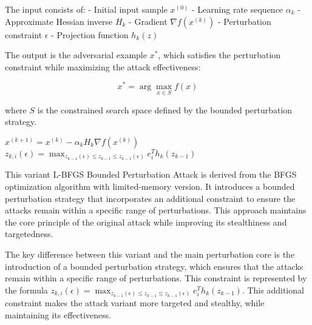 The input consists of:
- Initial input sample $x^{(0)}$
- Learning rate sequence $\alpha_k$
- Approximate Hessian inverse $H_k$
- Gradient $\nabla f(x^{(k)})$
- Perturbation constraint $\epsilon$
- Projection function $h_k(z)$

The output is the adversarial example $x^*$, which satisfies the perturbation constraint while maximizing the attack effectiveness:

\[
x^* = \arg\max_{x \in S} f(x)
\]

where $S$ is the constrained search space defined by the bounded perturbation strategy.

$x^{(k+1)} = x^{(k)} - \alpha_k H_k \nabla f(x^{(k)})$
$z_{k,i}(\epsilon) = \max_{z_{k-1}(\epsilon) \leq z_{k-1} \leq z_{k-1}(\epsilon)} e^T_i h_k(z_{k-1})$

This variant L-BFGS Bounded Perturbation Attack is derived from the BFGS optimization algorithm with limited-memory version. It introduces a bounded perturbation strategy that incorporates an additional constraint to ensure the attacks remain within a specific range of perturbations. This approach maintains the core principle of the original attack while improving its stealthiness and targetedness.

The key difference between this variant and the main perturbation core is the introduction of a bounded perturbation strategy, which ensures that the attacks remain within a specific range of perturbations. This constraint is represented by the formula $z_{k,i}(\epsilon) = \max_{z_{k-1}(\epsilon) \leq z_{k-1} \leq z_{k-1}(\epsilon)} e^T_i h_k(z_{k-1})$. This additional constraint makes the attack variant more targeted and stealthy, while maintaining its effectiveness.